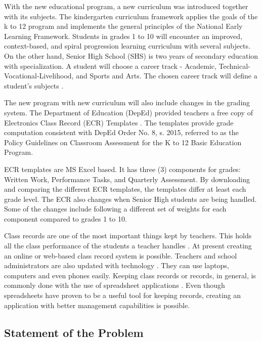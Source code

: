\documentclass[11pt,a4paper,titlepage]{article}
\begin{document}
With the new educational program, a new curriculum was introduced together with its subjects. The kindergarten curriculum framework applies the goals of the k to 12 program and implements the general principles of the National Early Learning Framework. Students in grades 1 to 10 will encounter an improved, context-based, and spiral progression learning curriculum with several subjects. On the other hand, Senior High School (SHS) is two years of secondary education with specialization. A student will choose a career track - Academic, Technical-Vocational-Livelihood, and Sports and Arts. The chosen career track will define a student's subjects \cite{Okabe}.

The new program with new curriculum will also include changes in the grading system. The Department of Education (DepEd) provided teachers a free copy of Electronics Class Record (ECR) Templates \cite{depEd}. The templates provide grade computation consistent with DepEd Order No. 8, s. 2015, referred to as the Policy Guidelines on Classroom Assessment for the K to 12 Basic Education Program. 

ECR templates are MS Excel based. It has three (3) components for grades: Written Work, Performance Tasks, and Quarterly Assessment. By downloading and comparing the different ECR templates, the templates differ at least each grade level. The ECR also changes when Senior High students are being handled. Some of the changes include following a different set of weights for each component compared to grades 1 to 10.

Class records are one of the most important things kept by teachers. This holds all the class performance of the students a teacher handles \cite{Dellosa}. At present creating an online or web-based class record system is possible. Teachers and school administrators are also updated with technology \cite{Dellosa}. They can use laptops, computers and even phones easily. Keeping class records or records, in general, is commonly done with the use of spreadsheet applications \cite{Dellosa}. Even though spreadsheets have proven to be a useful tool for keeping records, creating an application with better management capabilities is possible.

\subsection{Statement of the Problem}
\end{document}
